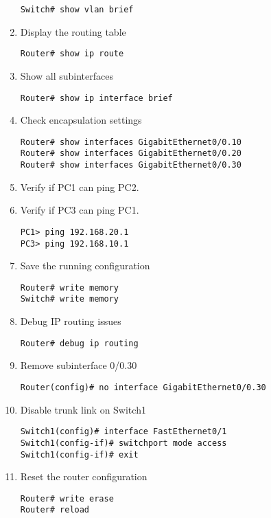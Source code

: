 \documentclass[a4paper]{book}
\begin{document}
\begin{enumerate}
\begin{lstlisting}
Switch# show vlan brief
\end{lstlisting}

\item{Display the routing table}

\begin{lstlisting}
Router# show ip route
\end{lstlisting}

\item{Show all subinterfaces}

\begin{lstlisting}
Router# show ip interface brief
\end{lstlisting}

\item{Check encapsulation settings}

\begin{lstlisting}
Router# show interfaces GigabitEthernet0/0.10
Router# show interfaces GigabitEthernet0/0.20
Router# show interfaces GigabitEthernet0/0.30
\end{lstlisting}

\item{Verify if PC1 can ping PC2.}
\item{Verify if PC3 can ping PC1.}
 
\begin{lstlisting}
PC1> ping 192.168.20.1
PC3> ping 192.168.10.1
\end{lstlisting}

\item{Save the running configuration}

\begin{lstlisting}
Router# write memory
Switch# write memory
\end{lstlisting}

\item{Debug IP routing issues}

\begin{lstlisting}
Router# debug ip routing
\end{lstlisting}

\item{Remove subinterface 0/0.30}

\begin{lstlisting}
Router(config)# no interface GigabitEthernet0/0.30
\end{lstlisting}

\item{Disable trunk link on Switch1}

\begin{lstlisting}
Switch1(config)# interface FastEthernet0/1
Switch1(config-if)# switchport mode access
Switch1(config-if)# exit
\end{lstlisting}

\item{Reset the router configuration}

\begin{lstlisting}
Router# write erase
Router# reload
\end{lstlisting}

\end{enumerate}
\end{document}
